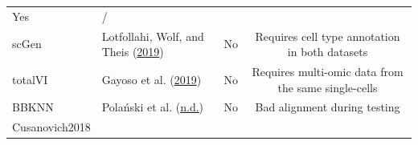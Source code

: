 \documentclass[]{article}
\begin{document}
\begin{longtable}[]{@{}llcc@{}}
\begin{minipage}[t]{0.30\columnwidth}
Yes\strut
\end{minipage} & \begin{minipage}[t]{0.28\columnwidth}\centering
/\strut
\end{minipage}\tabularnewline
\begin{minipage}[t]{0.17\columnwidth}\raggedright
scGen\strut
\end{minipage} & \begin{minipage}[t]{0.14\columnwidth}\raggedright
Lotfollahi, Wolf, and Theis
(\protect\hyperlink{ref-lotfollahiScGenPredictsSinglecell2019}{2019})\strut
\end{minipage} & \begin{minipage}[t]{0.30\columnwidth}\centering
No\strut
\end{minipage} & \begin{minipage}[t]{0.28\columnwidth}\centering
Requires cell type annotation in both datasets\strut
\end{minipage}\tabularnewline
\begin{minipage}[t]{0.17\columnwidth}\raggedright
totalVI\strut
\end{minipage} & \begin{minipage}[t]{0.14\columnwidth}\raggedright
Gayoso et al.
(\protect\hyperlink{ref-gayosoJointModelRNA2019}{2019})\strut
\end{minipage} & \begin{minipage}[t]{0.30\columnwidth}\centering
No\strut
\end{minipage} & \begin{minipage}[t]{0.28\columnwidth}\centering
Requires multi-omic data from the same single-cells\strut
\end{minipage}\tabularnewline
\begin{minipage}[t]{0.17\columnwidth}\raggedright
BBKNN\strut
\end{minipage} & \begin{minipage}[t]{0.14\columnwidth}\raggedright
Polański et al.
(\protect\hyperlink{ref-polanskiBBKNNFastBatch}{n.d.})\strut
\end{minipage} & \begin{minipage}[t]{0.30\columnwidth}\centering
No\strut
\end{minipage} & \begin{minipage}[t]{0.28\columnwidth}\centering
Bad alignment during testing\strut
\end{minipage}\tabularnewline
\begin{minipage}[t]{0.17\columnwidth}\raggedright
Cusanovich2018\strut

\end{minipage}
\end{longtable}
\end{document}
